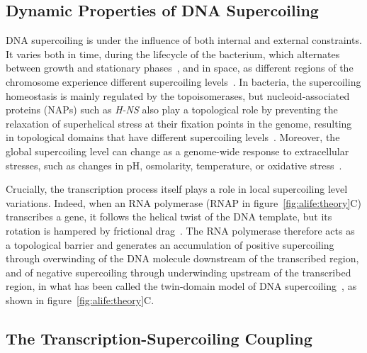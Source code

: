 \subsection{Dynamic Properties of DNA Supercoiling}

DNA supercoiling is under the influence of both internal and external constraints.
It varies both in time, during the lifecycle of the bacterium, which alternates between growth and stationary phases~\citep{krogh2018}, and in space, as different regions of the chromosome experience different supercoiling levels~\citep{lal2016, junier2016}.
In bacteria, the supercoiling homeostasis is mainly regulated by the topoisomerases, but nucleoid-associated proteins (NAPs) such as \emph{H-NS} also play a topological role by preventing the relaxation of superhelical stress at their fixation points in the genome, resulting in topological domains that have different supercoiling levels~\citep{krogh2018}.
Moreover, the global supercoiling level can change as a genome-wide response to extracellular stresses, such as changes in pH, osmolarity, temperature, or oxidative stress~\citep{duprey2021}.

Crucially, the transcription process itself plays a role in local supercoiling level variations.
Indeed, when an RNA polymerase (RNAP in figure~\ref{fig:alife:theory}C) transcribes a gene, it follows the helical twist of the DNA template, but its rotation is hampered by frictional drag~\citep{ma2016}.
The RNA polymerase therefore acts as a topological barrier and generates an accumulation of positive supercoiling through overwinding of the DNA molecule downstream of the transcribed region, and of negative supercoiling through underwinding upstream of the transcribed region, in what has been called the twin-domain model of DNA supercoiling~\citep{liu1987}, as shown in figure~\ref{fig:alife:theory}C.


\subsection{The Transcription-Supercoiling Coupling}

